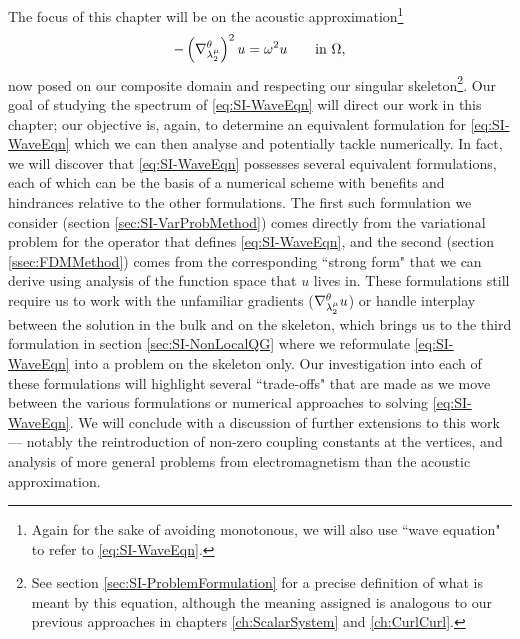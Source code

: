 The focus of this chapter will be on the acoustic approximation\footnote{Again for the sake of avoiding monotonous, we will also use ``wave equation" to refer to \eqref{eq:SI-WaveEqn}.}
\begin{align} \label{eq:SI-WaveEqn}
	-\left( \nabla^{\theta}_{\lambda_2^{\mu}} \right)^2 u = \omega^2 u \qquad\text{in } \Omega,
\end{align}
now posed on our composite domain and respecting our singular skeleton\footnote{See section \ref{sec:SI-ProblemFormulation} for a precise definition of what is meant by this equation, although the meaning assigned is analogous to our previous approaches in chapters \ref{ch:ScalarSystem} and \ref{ch:CurlCurl}.}.
Our goal of studying the spectrum of \eqref{eq:SI-WaveEqn} will direct our work in this chapter; our objective is, again, to determine an equivalent formulation for \eqref{eq:SI-WaveEqn} which we can then analyse and potentially tackle numerically.
In fact, we will discover that \eqref{eq:SI-WaveEqn} possesses several equivalent formulations, each of which can be the basis of a numerical scheme with benefits and hindrances relative to the other formulations.
The first such formulation we consider (section \ref{sec:SI-VarProbMethod}) comes directly from the variational problem for the operator that defines \eqref{eq:SI-WaveEqn}, and the second (section \ref{ssec:FDMMethod}) comes from the corresponding ``strong form" that we can derive using analysis of the function space that $u$ lives in.
These formulations still require us to work with the unfamiliar gradients ($\nabla^{\theta}_{\lambda_2^{\mu}}u$) or handle interplay between the solution in the bulk and on the skeleton, which brings us to the third formulation in section \ref{sec:SI-NonLocalQG} where we reformulate \eqref{eq:SI-WaveEqn} into a problem on the skeleton only.
Our investigation into each of these formulations will highlight several ``trade-offs" that are made as we move between the various formulations or numerical approaches to solving \eqref{eq:SI-WaveEqn}.
We will conclude with a discussion of further extensions to this work --- notably the reintroduction of non-zero coupling constants at the vertices, and analysis of more general problems from electromagnetism than the acoustic approximation.

